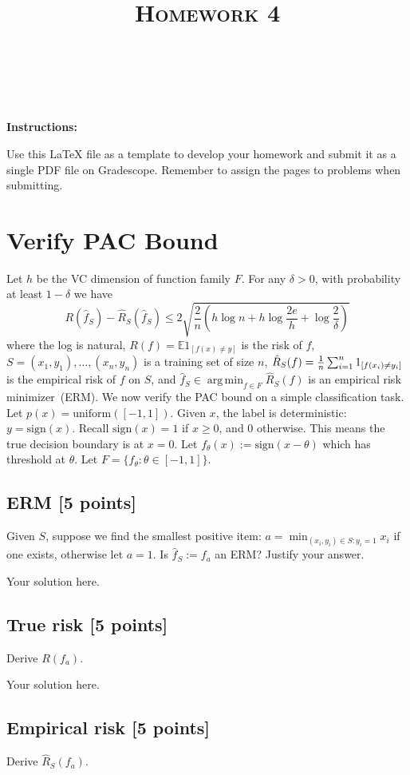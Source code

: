 \documentclass[a4paper]{article}
\title{\textsc{Homework 4}} %
\author{
\red{$>>$NAME HERE$<<$} \\
\red{$>>$ID HERE$<<$}\\
}
\date{}
\theoremstyle{definition}
\DeclareMathOperator*{\argmin}{arg\,min}
\def\E{\mathbb E}
\newcommand{\sgn}{\mathrm{sign}}
\begin{document}
\maketitle 


\textbf{Instructions:} 

Use this LaTeX file as a template to develop your homework and submit it as a single PDF file on Gradescope. 
Remember to assign the pages to problems when submitting.

\section{Verify PAC Bound}
Let $h$ be the VC dimension of function family $F$.
For any $\delta>0$, with probability at least $1-\delta$ we have
$$R(\hat f_S) - \hat R_S(\hat f_S) \le 2 \sqrt{\frac2n\left(h \log n + h \log\frac{2e}{h}  + \log \frac{2}{\delta}\right)}$$
where the log is natural, $R(f) = \E 1_{[f(x)\neq y]}$ is the risk of $f$,
$S=(x_1,y_1), \ldots, (x_n, y_n)$ is a training set of size $n$,
$\hat R_S(f) = {1\over n} \sum_{i=1}^n 1_{[f(x_i)\neq y_i]}$ is the empirical risk of $f$ on $S$,
and 
$\hat f_S \in \argmin_{f\in F} \hat R_S(f)$ is an empirical risk minimizer~(ERM).
We now verify the PAC bound on a simple classification task.  Let $p(x)=\mathrm{uniform}([-1,1])$.  Given $x$, the label is deterministic: $y=\sgn(x)$.
Recall $\sgn(x)=1$ if $x\ge 0$, and 0 otherwise.
This means the true decision boundary is at $x=0$.
Let $f_\theta(x) := \sgn(x-\theta)$ which has threshold at $\theta$.
Let $F=\{f_\theta: \theta \in [-1,1]\}$.  

\subsection{ERM [5 points]}

Given $S$, suppose we find the smallest positive item: $a = \min_{(x_i, y_i)\in S: y_i=1} x_i$ if one exists, otherwise let $a=1$.  Is $\hat f_S := f_a$ an ERM?  Justify your answer.

{\color{blue}
	Your solution here.
}

\subsection{True risk [5 points]}
Derive $R(f_a)$.

{\color{blue}
	Your solution here.
}

\subsection{Empirical risk [5 points]}
Derive $\hat R_S(f_a)$.
\end{document}
